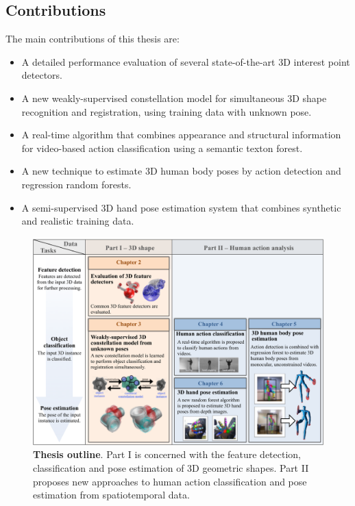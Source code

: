 \subsection{Contributions}

The main contributions of this thesis are:
\begin{itemize}
	\item A detailed performance evaluation of several state-of-the-art 3D interest point detectors.
	\item A new weakly-supervised constellation model for simultaneous 3D shape recognition and registration, using training data with unknown pose. 
	\item A real-time algorithm that combines appearance and structural information for video-based action classification using a semantic texton forest. 
	\item A new technique to estimate 3D human body poses by action detection and regression random forests. 
	\item A semi-supervised 3D hand pose estimation system that combines synthetic and realistic training data. 
\end{itemize}

\begin{figure}[t]
\centering
\includegraphics[width=1\linewidth]{./fig/intro/intro2.pdf}
\caption{\textbf{Thesis outline}. Part I is concerned with the feature detection, classification and pose estimation of 3D geometric shapes. Part II proposes new approaches to human action classification and pose estimation from spatiotemporal data.} 
\label{fig/intro/outline}
\end{figure}

